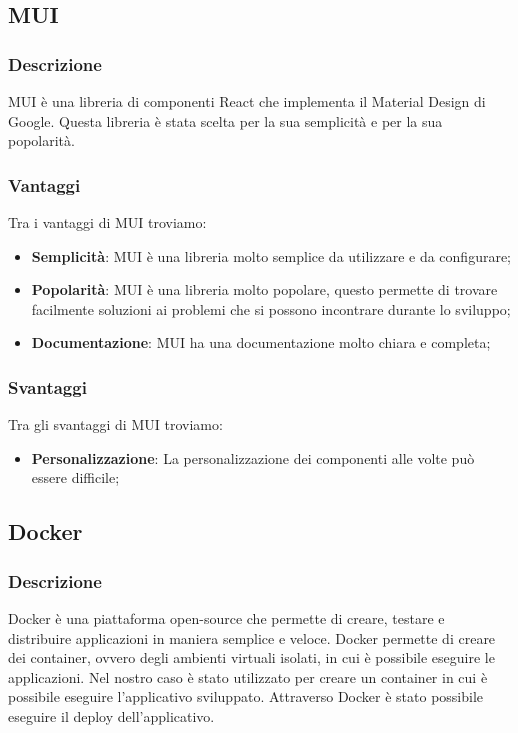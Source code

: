 \subsection*{MUI}

\subsubsection*{Descrizione}
MUI è una libreria di componenti React che implementa il Material Design di Google.
Questa libreria è stata scelta per la sua semplicità e per la sua popolarità.

\subsubsection*{Vantaggi}
Tra i vantaggi di MUI troviamo:
\begin{itemize}
    \item \textbf{Semplicità}: MUI è una libreria molto semplice da utilizzare e da configurare;
    \item \textbf{Popolarità}: MUI è una libreria molto popolare, questo permette di trovare facilmente soluzioni ai problemi che si possono incontrare durante lo sviluppo;
    \item \textbf{Documentazione}: MUI ha una documentazione molto chiara e completa;
\end{itemize}

\subsubsection*{Svantaggi}
Tra gli svantaggi di MUI troviamo:
\begin{itemize}
    \item \textbf{Personalizzazione}: La personalizzazione dei componenti alle volte può essere difficile;
\end{itemize}


\subsection*{Docker}

\subsubsection*{Descrizione}
Docker è una piattaforma open-source che permette di creare, testare e distribuire applicazioni in maniera semplice e veloce.
Docker permette di creare dei container, ovvero degli ambienti virtuali isolati, in cui è possibile eseguire le applicazioni. Nel nostro caso 
è stato utilizzato per creare un container in cui è possibile eseguire l'applicativo sviluppato. Attraverso Docker è stato possibile
eseguire il deploy dell'applicativo.

